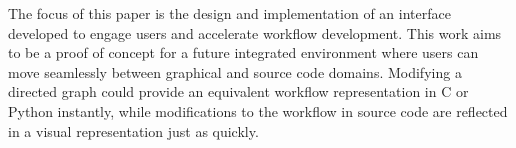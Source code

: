 	 The focus of this paper is the design and implementation of an interface developed to engage users and accelerate workflow development. This work aims to be a proof of concept for a future integrated environment where users can move seamlessly between graphical and source code domains. Modifying a directed graph could provide an equivalent workflow representation in C or Python instantly, while modifications to the workflow in source code are reflected in a visual representation just as quickly.
